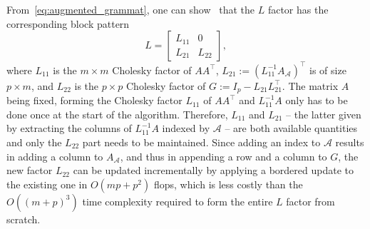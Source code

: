 \documentclass[pdflatex,sn-mathphys-num]{sn-jnl}%
\theoremstyle{thmstyleone}%
\newcommand{\calA}{{\mathcal{A}}}
\begin{document}
From~\eqref{eq:augmented_grammat}, one can show~\cite[Section~4.2.9]{golubvanloan:2013} that the $L$ factor has the corresponding block pattern
\[L = \begin{bmatrix}
	L_{11} & 0 \\ L_{21} & L_{22}
\end{bmatrix},\]
where 
$L_{11}$ is the $m \times m$ Cholesky factor of $AA^\top$, $L_{21} := (L_{11}^{-1} A_{\calA})^\top$ is of size $p \times m$, and $L_{22}$ is the $p \times p$ Cholesky factor of $G := I_p - L_{21}L_{21}^\top$.
The matrix $A$ being fixed, forming the Cholesky factor $L_{11}$ of $AA^\top$ and $L_{11}^{-1} A$ only has to be done once at the start of the algorithm. Therefore, $L_{11}$ and $L_{21}$ -- the latter given by extracting the columns of $L_{11}^{-1} A$ indexed by $\calA$ -- are both available quantities and only the $L_{22}$ part needs to be maintained. Since adding an index to $\calA$ results in adding a column to $A_\calA$, and thus in appending a row and a column to $G$, the new factor $L_{22}$ can be updated incrementally by applying a bordered update to the existing one in $O(mp+p^2)$ flops, which is less costly than the $O((m+p)^3)$ time complexity required to form the entire $L$ factor from scratch.
\end{document}
